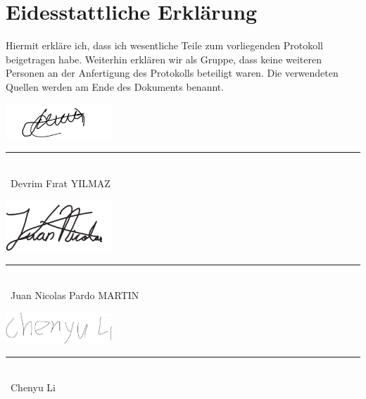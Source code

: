 %
%
%
\section*{Eidesstattliche Erklärung}
%
Hiermit erkläre ich, dass ich wesentliche Teile zum vorliegenden Protokoll beigetragen habe. Weiterhin erklären wir als Gruppe, dass keine weiteren Personen an der Anfertigung des Protokolls beteiligt waren. Die verwendeten Quellen werden am Ende des Dokuments benannt.
%
\par
\vspace{1.5cm}
%
\hspace{0.5cm}\includegraphics[width=4cm]{Elektronik-Laborprotokoll_PLL/Unterschriften/Devrim_Unterschrift.pdf} \\
\rule{5cm}{0.5pt}\\
\ Devrim Fırat YILMAZ
%
\par
\vspace{1.5cm}
%
\hspace{0.5cm}\includegraphics[width=4cm]{Elektronik-Laborprotokoll_PLL/Unterschriften/kjuan.pdf} \\
\rule{5cm}{0.5pt}\\
\ Juan Nicolas Pardo MARTIN
%
\par
\vspace{1.5cm}
%
\hspace{0.5cm}\includegraphics[width=4cm]{Elektronik-Laborprotokoll_PLL/Unterschriften/Chenyu_Unterschrift.jpg} \\
\rule{5cm}{0.5pt}\\
\ Chenyu Li
%
%
%

%

%
%
%